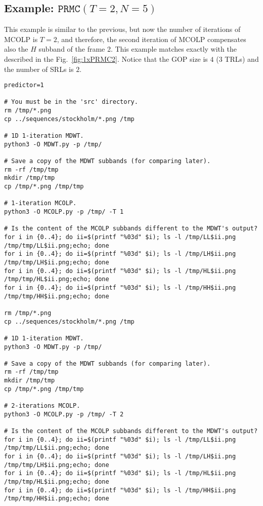 
\subsection{Example: $\mathtt{PRMC}(T=2, N=5)$}

This example is similar to the previous, but now the number of
iterations of MCOLP is $T=2$, and therefore, the second iteration of
MCOLP compensates also the $H$ subband of the frame 2. This example
matches exactly with the described in the
Fig.~\ref{fig:1xPRMC2}. Notice that the GOP size is $4$ ($3$ TRLs) and
the number of SRLs is $2$.

\begin{verbatim}
predictor=1

# You must be in the 'src' directory.
rm /tmp/*.png
cp ../sequences/stockholm/*.png /tmp

# 1D 1-iteration MDWT.
python3 -O MDWT.py -p /tmp/

# Save a copy of the MDWT subbands (for comparing later).
rm -rf /tmp/tmp
mkdir /tmp/tmp
cp /tmp/*.png /tmp/tmp

# 1-iteration MCOLP.
python3 -O MCOLP.py -p /tmp/ -T 1

# Is the content of the MCOLP subbands different to the MDWT's output?
for i in {0..4}; do ii=$(printf "%03d" $i); ls -l /tmp/LL$ii.png /tmp/tmp/LL$ii.png;echo; done
for i in {0..4}; do ii=$(printf "%03d" $i); ls -l /tmp/LH$ii.png /tmp/tmp/LH$ii.png;echo; done
for i in {0..4}; do ii=$(printf "%03d" $i); ls -l /tmp/HL$ii.png /tmp/tmp/HL$ii.png;echo; done
for i in {0..4}; do ii=$(printf "%03d" $i); ls -l /tmp/HH$ii.png /tmp/tmp/HH$ii.png;echo; done

rm /tmp/*.png
cp ../sequences/stockholm/*.png /tmp

# 1D 1-iteration MDWT.
python3 -O MDWT.py -p /tmp/

# Save a copy of the MDWT subbands (for comparing later).
rm -rf /tmp/tmp
mkdir /tmp/tmp
cp /tmp/*.png /tmp/tmp

# 2-iterations MCOLP.
python3 -O MCOLP.py -p /tmp/ -T 2

# Is the content of the MCOLP subbands different to the MDWT's output?
for i in {0..4}; do ii=$(printf "%03d" $i); ls -l /tmp/LL$ii.png /tmp/tmp/LL$ii.png;echo; done
for i in {0..4}; do ii=$(printf "%03d" $i); ls -l /tmp/LH$ii.png /tmp/tmp/LH$ii.png;echo; done
for i in {0..4}; do ii=$(printf "%03d" $i); ls -l /tmp/HL$ii.png /tmp/tmp/HL$ii.png;echo; done
for i in {0..4}; do ii=$(printf "%03d" $i); ls -l /tmp/HH$ii.png /tmp/tmp/HH$ii.png;echo; done


\end{verbatim}

